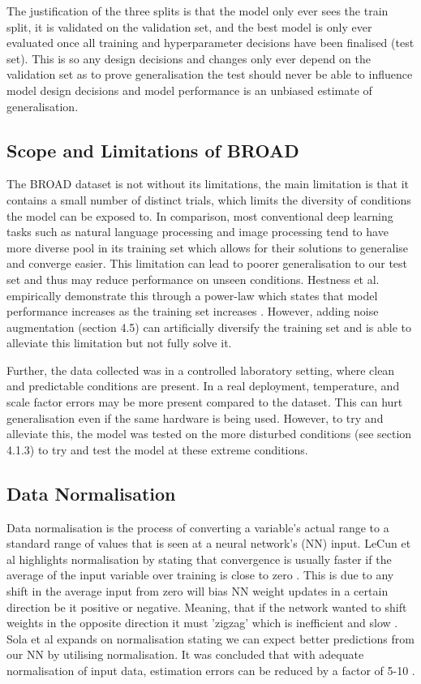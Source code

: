 \FloatBarrier

The justification of the three splits is that the model only ever sees the train split, it is validated on the validation set, and the best model is only
ever evaluated once all training and hyperparameter decisions have been finalised (test set). This is so any design decisions and changes only ever depend on the validation set as to prove generalisation the test should never be
able to influence model design decisions and model performance is an unbiased estimate of generalisation.



\subsection{Scope and Limitations of BROAD}
The BROAD dataset is not without its limitations, the main limitation is that it contains a small number of distinct trials,
which limits the diversity of conditions the model can be exposed to. In comparison, most 
conventional deep learning tasks such as natural language processing and image processing tend to have more diverse pool in its training set 
which allows for their solutions to generalise and converge easier.
This limitation can lead to poorer 
generalisation to our test set and thus may reduce performance on unseen conditions. Hestness et al. empirically demonstrate this
through a power-law which states that model performance increases as the training set increases \cite{hestness_deep}. However,
adding noise augmentation (section 4.5) can artificially diversify the training set and is able to alleviate this limitation but not fully solve it. 

Further, the data collected was in a controlled laboratory setting, where clean and predictable conditions are present. In a real deployment, 
temperature, and scale factor errors may be more present compared to the dataset. This can hurt generalisation even if the same hardware
is being used. However, to try and alleviate this, the model was tested on the more disturbed conditions (see section 4.1.3) to try and test the model at
these extreme conditions.

\subsection{Data Normalisation}
Data normalisation is the process of converting a variable's actual range to a standard range
of values that is seen at a neural network's (NN) input.  
LeCun et al highlights normalisation by stating that convergence is usually faster if the average of the
input variable over training is close to zero \cite{lecun_1998_efficient}.
This is due to any shift in the average input from zero will bias NN weight updates in a certain direction
be it positive or negative. Meaning, that if the network wanted to shift weights in the opposite direction
it must 'zigzag' which is inefficient and slow \cite{lecun_1998_efficient}. 
Sola et al expands on normalisation stating 
we can expect better predictions from our NN by utilising normalisation. It was 
concluded that with adequate normalisation of input data, estimation errors can be reduced by a factor of 5-10 \cite{sola_1997_importance}. 

